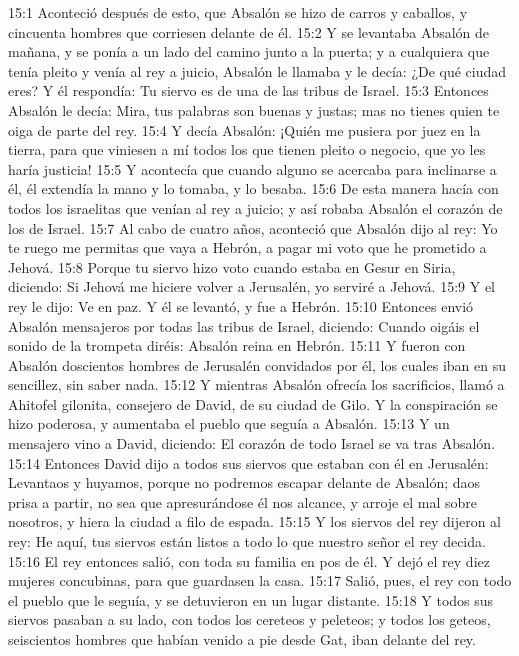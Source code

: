 15:1 Aconteció después de esto, que Absalón se hizo de carros y caballos, y cincuenta hombres que corriesen delante de él.  
15:2 Y se levantaba Absalón de mañana, y se ponía a un lado del camino junto a la puerta; y a cualquiera que tenía pleito y venía al rey a juicio, Absalón le llamaba y le decía: ¿De qué ciudad eres? Y él respondía: Tu siervo es de una de las tribus de Israel.  
15:3 Entonces Absalón le decía: Mira, tus palabras son buenas y justas; mas no tienes quien te oiga de parte del rey.  
15:4 Y decía Absalón: ¡Quién me pusiera por juez en la tierra, para que viniesen a mí todos los que tienen pleito o negocio, que yo les haría justicia! 
15:5 Y acontecía que cuando alguno se acercaba para inclinarse a él, él extendía la mano y lo tomaba, y lo besaba.  
15:6 De esta manera hacía con todos los israelitas que venían al rey a juicio; y así robaba Absalón el corazón de los de Israel.  
15:7 Al cabo de cuatro años, aconteció que Absalón dijo al rey: Yo te ruego me permitas que vaya a Hebrón, a pagar mi voto que he prometido a Jehová.  
15:8 Porque tu siervo hizo voto cuando estaba en Gesur en Siria, diciendo: Si Jehová me hiciere volver a Jerusalén, yo serviré a Jehová.  
15:9 Y el rey le dijo: Ve en paz. Y él se levantó, y fue a Hebrón.  
15:10 Entonces envió Absalón mensajeros por todas las tribus de Israel, diciendo: Cuando oigáis el sonido de la trompeta diréis: Absalón reina en Hebrón.  
15:11 Y fueron con Absalón doscientos hombres de Jerusalén convidados por él, los cuales iban en su sencillez, sin saber nada.  
15:12 Y mientras Absalón ofrecía los sacrificios, llamó a Ahitofel gilonita, consejero de David, de su ciudad de Gilo. Y la conspiración se hizo poderosa, y aumentaba el pueblo que seguía a Absalón.  
15:13 Y un mensajero vino a David, diciendo: El corazón de todo Israel se va tras Absalón.  
15:14 Entonces David dijo a todos sus siervos que estaban con él en Jerusalén: Levantaos y huyamos, porque no podremos escapar delante de Absalón; daos prisa a partir, no sea que apresurándose él nos alcance, y arroje el mal sobre nosotros, y hiera la ciudad a filo de espada.  
15:15 Y los siervos del rey dijeron al rey: He aquí, tus siervos están listos a todo lo que nuestro señor el rey decida.  
15:16 El rey entonces salió, con toda su familia en pos de él. Y dejó el rey diez mujeres concubinas, para que guardasen la casa.  
15:17 Salió, pues, el rey con todo el pueblo que le seguía, y se detuvieron en un lugar distante.  
15:18 Y todos sus siervos pasaban a su lado, con todos los cereteos y peleteos; y todos los geteos, seiscientos hombres que habían venido a pie desde Gat, iban delante del rey.  
